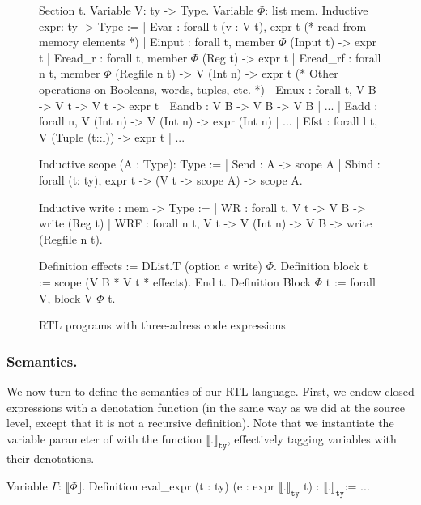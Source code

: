 \documentclass{llncs}
\newcommand{\denote}[1]{\llbracket #1 \rrbracket}
\newcommand{\denotety}[1]{\denote{\mathtt{#1}}_{\mathtt{ty}}}
\begin{document}
\begin{figure}[t]
  \centering
\begin{coq}
Section t. 
  Variable V: ty -> Type. Variable $\Phi$: list mem. 
  Inductive expr: ty -> Type :=
  | Evar : forall t (v : V t), expr t
  (* read from memory elements *)
  | Einput : forall t, member $\Phi$ (Input t) -> expr t
  | Eread_r : forall t, member $\Phi$ (Reg t) -> expr t
  | Eread_rf : forall n t, member $\Phi$ (Regfile n t) -> V (Int n) -> expr t
  (* Other operations on Booleans, words, tuples, etc. *)
  | Emux : forall t, V B -> V t -> V t -> expr t
  | Eandb : V B -> V B -> V B | ...   
  | Eadd : forall n, V (Int n) -> V (Int n) -> expr (Int n) | ...  
  | Efst : forall l t, V (Tuple (t::l)) -> expr t | ...  
  
  Inductive scope (A : Type): Type :=
  | Send : A -> scope A
  | Sbind : forall (t: ty), expr t -> (V t -> scope A) -> scope A. 
  
  Inductive write : mem -> Type :=
  | WR : forall t, V t -> V B -> write (Reg t)
  | WRF : forall n t, V t -> V (Int n) -> V B ->  write (Regfile n t). 
       
  Definition effects := DList.T (option $\circ$ write) $\Phi$. 
  Definition block t := scope (V B * V t *  effects).         
End t.
Definition Block $\Phi$ t := forall V, block V $\Phi$ t.
\end{coq}
  \caption{RTL programs with three-adress code expressions}
  \label{fig:rtl}
\end{figure}

\subsubsection{Semantics.} We now turn to define the semantics of our RTL
language. 
%
First, we endow closed expressions with a denotation function (in the
same way as we did at the source level, except that it is not a
recursive definition).
%
Note that we instantiate the variable parameter of  with
the function $\denotety{.}$, effectively tagging variables with their
denotations.

\begin{mcoq}
Variable $\Gamma$: $\denote{\Phi}$. 
Definition eval_expr (t : ty) (e : expr $\denotety{.}$ t) : $\denotety{.}$:= ...
\end{mcoq}
\end{document}
